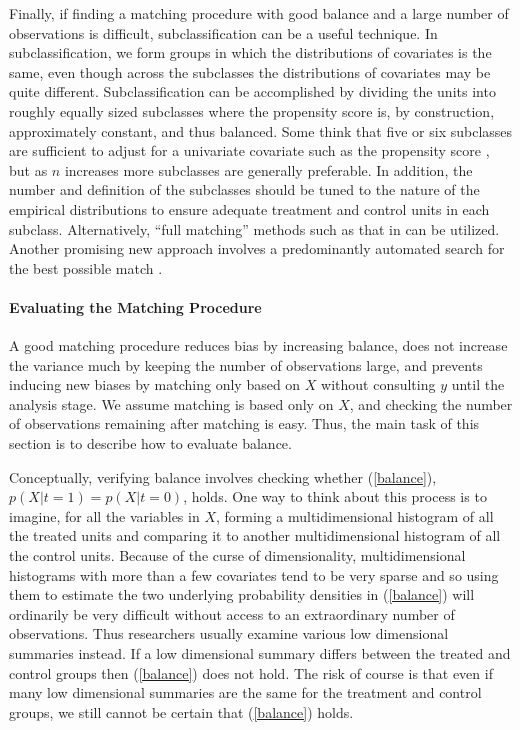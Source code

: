 \documentclass[11pt,titlepage]{article}
\begin{document}
Finally, if finding a matching procedure with good balance and a large
number of observations is difficult, subclassification can be a useful
technique.  In subclassification, we form groups in which the
distributions of covariates is the same, even though across the
subclasses the distributions of covariates may be quite different.
Subclassification can be accomplished by dividing the units into
roughly equally sized subclasses where the propensity score is, by
construction, approximately constant, and thus balanced.  Some think
that five or six subclasses are sufficient to adjust for a univariate
covariate such as the propensity score \citep{Cochran68,RosRub84}, but
as $n$ increases more subclasses are generally preferable.  In
addition, the number and definition of the subclasses should be tuned
to the nature of the empirical distributions to ensure adequate
treatment and control units in each subclass.  Alternatively, ``full
matching'' methods such as that in \citet{Hansen04} can be utilized.
Another promising new approach involves a predominantly automated
search for the best possible match \citep{DiaSek05}.

\paragraph{Evaluating the Matching Procedure}
A good matching procedure reduces bias by increasing balance, does not
increase the variance much by keeping the number of observations
large, and prevents inducing new biases by matching only based on $X$
without consulting $y$ until the analysis stage.  We assume matching
is based only on $X$, and checking the number of observations
remaining after matching is easy.  Thus, the main task of this section
is to describe how to evaluate balance.

Conceptually, verifying balance involves checking whether
(\ref{balance}), $p(X|t=1)=p(X|t=0)$, holds.  One way to think about
this process is to imagine, for all the variables in $X$, forming a
multidimensional histogram of all the treated units and comparing it
to another multidimensional histogram of all the control units.
Because of the curse of dimensionality, multidimensional histograms
with more than a few covariates tend to be very sparse and so using
them to estimate the two underlying probability densities in
(\ref{balance}) will ordinarily be very difficult without access to an
extraordinary number of observations.  Thus researchers usually
examine various low dimensional summaries instead.  If a low
dimensional summary differs between the treated and control groups
then (\ref{balance}) does not hold.  The risk of course is that even
if many low dimensional summaries are the same for the treatment and
control groups, we still cannot be certain that (\ref{balance}) holds.
\end{document}

